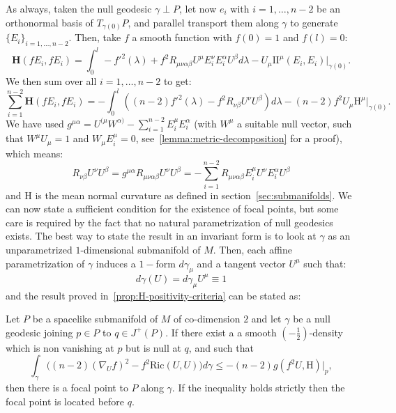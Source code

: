 As always, taken the null geodesic \(\gamma\perp P\), let now \(e_i\) with \(i = 1, \ldots, n - 2\) be an orthonormal basis of \(T_{\gamma(0)}P\), and parallel transport them along \(\gamma\) to generate \(\{E_i\}_{i = 1, \ldots, n-2}\). Then, take \(f\) a smooth function with \(f(0) = 1\) and \(f(l) = 0\):
\begin{equation*}
	\textbf{H}(fE_i, fE_i) = \int_{0}^{l} -f'^2(\lambda) + f^2R_{\mu\nu\alpha\beta}U^{\mu}E_i^{\nu}E_i^{\alpha}U^{\beta} d\lambda- U_{\mu}\mathrm{I\!I}^{\mu}(E_i, E_i)\Big\vert_{\gamma(0)}.
\end{equation*}
We then sum over all \(i = 1, \ldots, n - 2\) to get:
\begin{equation}
	\label{eq:hessian-averagded}
	\sum_{i=1}^{n - 2}\textbf{H}(fE_i, fE_i) = - \int_{0}^{l} \left((n - 2)f'^2(\lambda) - f^2R_{\nu\beta}U^{\nu}U^{\beta}\right) d\lambda - (n - 2)f^2U_{\mu}\mathrm{H}^{\mu}\Big\vert_{\gamma(0)}.
\end{equation}
We have used \(g^{\mu\alpha} = U^{(\mu}W^{\alpha)} - \sum_{i=1}^{n - 2}E_i^{\mu}E_i^{\alpha}\) (with \(W^{\mu}\) a suitable null vector, such that \(W^{\mu}U_{\mu} = 1\) and \(W_{\mu}E_i^{\mu} = 0\), see~\ref{lemma:metric-decomposition} for a proof), which means:
	\[
	R_{\nu\beta}U^{\nu}U^{\beta} = g^{\mu\alpha}R_{\mu\nu\alpha\beta}U^{\nu}U^{\beta} = - \sum_{i=1}^{n - 2}R_{\mu\nu\alpha\beta}E_i^{\mu}U^{\nu}E_i^{\alpha}U^{\beta}
	\]
and \(\mathrm{H}\) is the mean normal curvature as defined in section~\ref{sec:submanifolds}.
We can now state a sufficient condition for the existence of focal points, but some care is required by the fact that no natural parametrization of null geodesics exists.
The best way to state the result in an invariant form is to look at \(\gamma\) as an unparametrized \(1\)-dimensional submanifold of \(M\).
Then, each affine parametrization of \(\gamma\) induces a \(1-\)form \(d\gamma_{\mu}\) and a tangent vector \(U^{\mu}\) such that:
\[
d\gamma(U) = d\gamma_{\mu}U^{\mu} \equiv 1
\]
and the result proved in~\ref{prop:H-positivity-criteria} can be stated as:
\begin{prop}
	\label{prop:fp-criteria}
	Let \(P\) be a spacelike submanifold of \(M\) of co-dimension \(2\) and let \(\gamma\) be a null geodesic joining \(p \in P\) to \(q\in J^+(P)\). If there exist a a smooth \((-\frac{1}{2})\)-density which is non vanishing at \(p\) but is null at \(q\), and such that
	\begin{equation}
	\label{eq:fp-criteria}
	\int_{\gamma} \big((n -2)(\nabla_Uf)^2 - f^2\text{Ric}(U, U) \big)d\gamma\le -(n -2) g(f^2 U, \mathrm{H})\Big\vert_{p},
	\end{equation}
	then there is a focal point to \(P\) along \(\gamma\). If the inequality holds strictly then the focal point is located before \(q\).
\end{prop}

